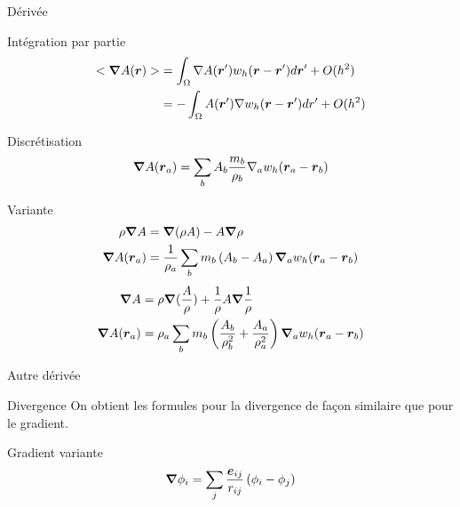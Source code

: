\begin{frame}[<+->]{Dérivée}
 \begin{block}{Intégration par partie}
 \begin{align*}
  <{\boldsymbol {\nabla}} A({\boldsymbol {r}})>&=\int_{\Omega} \nabla A({\boldsymbol {r}}')w_{h}({\boldsymbol {r}}-{\boldsymbol {r}}')d{\boldsymbol {r}}'+O(h^2)\\
  &=-\int_{\Omega} A({\boldsymbol {r}}')\nabla w_{h}({\boldsymbol {r}}-{\boldsymbol {r}}')dr'+O(h^2)
 \end{align*}
\end{block}
\begin{block}{Discrétisation}
\begin{equation*}
 {\boldsymbol {\nabla}} A({\boldsymbol {r}}_a)=\sum_{b}A_b\frac{m_b}{\rho_b}\nabla_a w_{h}({\boldsymbol {r}}_a-{\boldsymbol {r}}_b)
 \end{equation*}
\end{block}
\begin{block}{Variante}
 \begin{align*}
  \rho{\boldsymbol {\nabla}} A&={\boldsymbol {\nabla}}(\rho A)-A{\boldsymbol {\nabla}} \rho\\
  {\boldsymbol {\nabla}} A({\boldsymbol {r}}_a)&=\frac{1}{\rho_a}\sum_{b}m_b \left(A_b-A_a\right) {\boldsymbol {\nabla}}_a w_{h}({\boldsymbol {r}}_a-{\boldsymbol {r}}_b)
 \end{align*}
\begin{align*}
 {\boldsymbol {\nabla}} A&=\rho{\boldsymbol {\nabla}}(\frac{A}{\rho})+\frac{1}{\rho}A{\boldsymbol {\nabla}} \frac{1}{\rho}\\
 {\boldsymbol {\nabla}} A({\boldsymbol {r}}_a)&=\rho_a\sum_{b} m_b\left(\frac{A_b}{\rho_b^2}+\frac{A_a}{\rho_a^2}\right) {\boldsymbol {\nabla}}_a w_{h}({\boldsymbol {r}}_a-{\boldsymbol {r}}_b)
\end{align*}

\end{block}


\end{frame}

\begin{frame}[<+->]{Autre dérivée}
 \begin{block}{Divergence}
  On obtient les formules pour la divergence de façon similaire que pour le gradient.
 \end{block}

 \begin{block}{Gradient variante}
 \begin{equation*}
  {\boldsymbol {\nabla}} \phi_{i}=\sum_{j}\frac{{\boldsymbol {e}}_{ij}}{r_{ij}}\left(\phi_{i}-\phi_{j}\right)
  \end{equation*}
 \end{block}

\end{frame}

